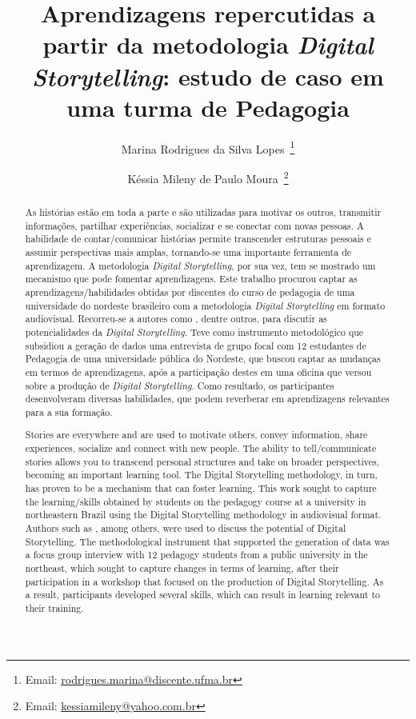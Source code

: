 \documentclass[portuguese]{textolivre}
\title{Aprendizagens repercutidas a partir da metodologia \textit{Digital Storytelling}: estudo de caso em uma turma de Pedagogia}
\author[1]{Marina Rodrigues da Silva Lopes~\orcid{0000-0003-4128-4583}\thanks{Email: \href{mailto:rodrigues.marina@discente.ufma.br}{rodrigues.marina@discente.ufma.br}}}
\author[1]{Késsia Mileny de Paulo Moura~\orcid{0000-0002-5124-1432}\thanks{Email: \href{mailto:kessiamileny@yahoo.com.br}{kessiamileny@yahoo.com.br}}}
\affil[1]{Universidade Federal do Maranhão, CCIM, Imperatriz, MA, Brasil.}
\begin{document}
\maketitle
\begin{polyabstract}
\begin{abstract}
As histórias estão em toda a parte e são utilizadas para motivar os outros, transmitir informações, partilhar experiências, socializar e se conectar com novas pessoas. A habilidade de contar/comunicar histórias permite transcender estruturas pessoais e assumir perspectivas mais amplas, tornando-se uma importante ferramenta de aprendizagem. A metodologia \textit{Digital Storytelling}, por sua vez, tem se mostrado um mecanismo que pode fomentar aprendizagens. Este trabalho procurou captar as aprendizagens/habilidades obtidas por discentes do curso de pedagogia de uma universidade do nordeste brasileiro com a metodologia \textit{Digital Storytelling} em formato audiovisual. Recorreu-se a autores como \textcite{rodrigues2020narrativas,rodrigues2023para,pasinato2023educacao,moura2023narrativa,prado2017narrativas,cruz2016letramentos,robin2006usos}, dentre outros, para discutir as potencialidades da \textit{Digital Storytelling}. Teve como instrumento metodológico que subsidiou a geração de dados uma entrevista de grupo focal com 12 estudantes de Pedagogia de uma universidade pública do Nordeste, que buscou captar as mudanças em termos de aprendizagens, após a participação destes em uma oficina que versou sobre a produção de \textit{Digital Storytelling}. Como resultado, os participantes desenvolveram diversas habilidades, que podem reverberar em aprendizagens relevantes para a sua formação.

\end{abstract}

\begin{english}
\begin{abstract}
Stories are everywhere and are used to motivate others, convey information, share experiences, socialize and connect with new people. The ability to tell/communicate stories allows you to transcend personal structures and take on broader perspectives, becoming an important learning tool. The Digital Storytelling methodology, in turn, has proven to be a mechanism that can foster learning. This work sought to capture the learning/skills obtained by students on the pedagogy course at a university in northeastern Brazil using the Digital Storytelling methodology in audiovisual format. Authors such as \textcite{rodrigues2020narrativas,rodrigues2023para,pasinato2023educacao,moura2023narrativa,prado2017narrativas,cruz2016letramentos,robin2006usos}, among others, were used to discuss the potential of Digital Storytelling. The methodological instrument that supported the generation of data was a focus group interview with 12 pedagogy students from a public university in the northeast, which sought to capture changes in terms of learning, after their participation in a workshop that focused on the production of Digital Storytelling. As a result, participants developed several skills, which can result in learning relevant to their training.


\end{abstract}
\end{english}
\end{polyabstract}
\end{document}
